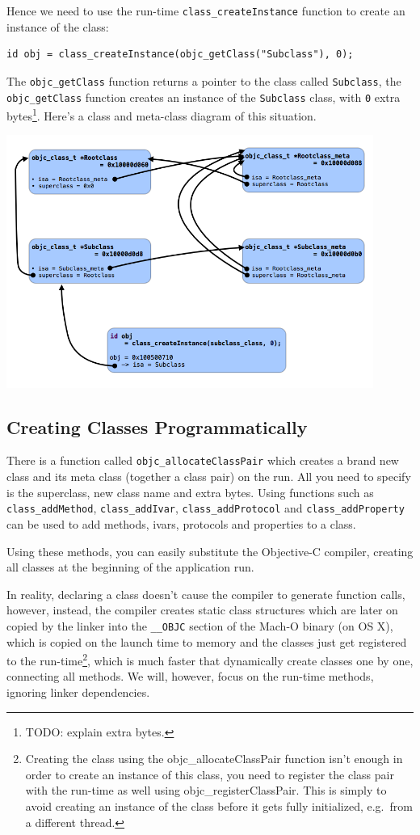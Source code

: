 \documentclass[a4paper, 11pt, fleqn]{book}
\begin{document}
Hence we need to use the run-time \verb=class_createInstance= function to create an instance of the class: 
\begin{verbatim}
id obj = class_createInstance(objc_getClass("Subclass"), 0);
\end{verbatim}

The \verb=objc_getClass= function returns a pointer to the class called \verb=Subclass=, the \verb=objc_getClass= function creates an instance of the \verb=Subclass= class, with \verb=0= extra bytes\footnote{TODO: explain extra bytes.}. Here's a class and meta-class diagram of this situation.

\includegraphics[width=120mm]{metaclass_graph.png}

\subsection{Creating Classes Programmatically}

There is a function called \verb=objc_allocateClassPair= which creates a brand new class and its meta class (together a class pair) on the run. All you need to specify is the superclass, new class name and extra bytes. Using functions such as \verb=class_addMethod=, \verb=class_addIvar=, \verb=class_addProtocol= and \verb=class_addProperty= can be used to add methods, ivars, protocols and properties to a class.

Using these methods, you can easily substitute the Objective-C compiler, creating all classes at the beginning of the application run. 

In reality, declaring a class doesn't cause the compiler to generate function calls, however, instead, the compiler creates static class structures which are later on copied by the linker into the \verb=__OBJC= section of the Mach-O binary (on OS X), which is copied on the launch time to memory and the classes just get registered to the run-time\footnote{Creating the class using the objc\_allocateClassPair function isn't enough in order to create an instance of this class, you need to register the class pair with the run-time as well using objc\_registerClassPair. This is simply to avoid creating an instance of the class before it gets fully initialized, e.g.\ from a different thread.}, which is much faster that dynamically create classes one by one, connecting all methods. We will, however, focus on the run-time methods, ignoring linker dependencies.
\end{document}
